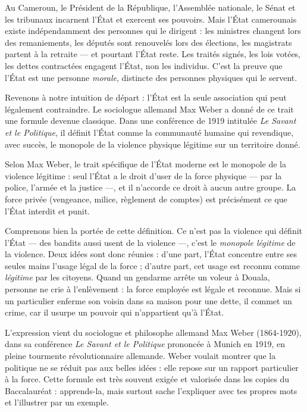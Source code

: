 \documentclass[11pt]{article}
\newcommand{\cle}[1]{{\popxbold\color{popdark}#1}}
\newcounter{popsec}
\newcounter{popsub}
\newcommand{\courssub}[1]{%
  \stepcounter{popsub}%
  \par\vspace{9pt}\noindent{\popxbold\fontsize{11.5}{13}\selectfont\color{popink}{\color{poporange}\thepopsec.\thepopsub}\hspace{6pt}#1}\par\nopagebreak\vspace{4pt}
}
\begin{document}
\begin{exemplebox}
Au Cameroun, le Président de la République, l'Assemblée nationale, le Sénat et les tribunaux incarnent l'État et exercent ses pouvoirs. Mais l'État camerounais existe indépendamment des personnes qui le dirigent : les ministres changent lors des remaniements, les députés sont renouvelés lors des élections, les magistrats partent à la retraite — et pourtant l'État reste. Les traités signés, les lois votées, les dettes contractées engagent l'État, non les individus. C'est la preuve que l'État est une personne \emph{morale}, distincte des personnes physiques qui le servent.
\end{exemplebox}

\courssub{Le monopole de la violence légitime (Max Weber)}

Revenons à notre intuition de départ : l'État est la seule association qui peut légalement contraindre. Le sociologue allemand Max Weber a donné de ce trait une formule devenue classique. Dans une conférence de 1919 intitulée \emph{Le Savant et le Politique}, il définit l'État comme la communauté humaine qui revendique, avec succès, le monopole de la violence physique légitime sur un territoire donné.

\begin{propriete}
Selon Max Weber, le trait spécifique de l'État moderne est le \cle{monopole de la violence légitime} : seul l'État a le droit d'user de la force physique — par la police, l'armée et la justice —, et il n'accorde ce droit à aucun autre groupe. La force privée (vengeance, milice, règlement de comptes) est précisément ce que l'État interdit et punit.
\end{propriete}

Comprenons bien la portée de cette définition. Ce n'est pas la violence qui définit l'État — des bandits aussi usent de la violence —, c'est le \emph{monopole légitime} de la violence. Deux idées sont donc réunies : d'une part, l'État concentre entre ses seules mains l'usage légal de la force ; d'autre part, cet usage est reconnu comme \emph{légitime} par les citoyens. Quand un gendarme arrête un voleur à Douala, personne ne crie à l'enlèvement : la force employée est légale et reconnue. Mais si un particulier enferme son voisin dans sa maison pour une dette, il commet un crime, car il usurpe un pouvoir qui n'appartient qu'à l'État.

\begin{savaistu}
L'expression vient du sociologue et philosophe allemand Max Weber (1864-1920), dans sa conférence \emph{Le Savant et le Politique} prononcée à Munich en 1919, en pleine tourmente révolutionnaire allemande. Weber voulait montrer que la politique ne se réduit pas aux belles idées : elle repose sur un rapport particulier à la force. Cette formule est très souvent exigée et valorisée dans les copies du Baccalauréat : apprends-la, mais surtout sache l'expliquer avec tes propres mots et l'illustrer par un exemple.
\end{savaistu}
\end{document}

